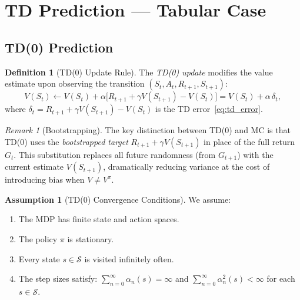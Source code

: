 \documentclass[11pt,a4paper]{article}
\theoremstyle{definition}
\newtheorem{definition}{Definition}[section]
\newtheorem{assumption}{Assumption}[section]
\theoremstyle{plain}
\theoremstyle{remark}
\newtheorem{remark}{Remark}[section]
\begin{document}
\section{TD Prediction --- Tabular Case}
\label{sec:td_prediction}

\subsection{TD(0) Prediction}
\label{subsec:td0}

\begin{definition}[TD(0) Update Rule]
\label{def:td0}
The \emph{TD(0) update} modifies the value estimate upon observing the transition $(S_t, A_t, R_{t+1}, S_{t+1})$:
\begin{equation}
    V(S_t) \leftarrow V(S_t) + \alpha \bigl[R_{t+1} + \gamma V(S_{t+1}) - V(S_t)\bigr] = V(S_t) + \alpha\,\delta_t,
    \label{eq:td0_update}
\end{equation}
where $\delta_t = R_{t+1} + \gamma V(S_{t+1}) - V(S_t)$ is the TD error~\eqref{eq:td_error}.
\end{definition}

\begin{remark}[Bootstrapping]
\label{rem:bootstrapping}
The key distinction between TD(0) and MC is that TD(0) uses the \emph{bootstrapped target} $R_{t+1} + \gamma V(S_{t+1})$ in place of the full return $G_t$. This substitution replaces all future randomness (from $G_{t+1}$) with the current estimate $V(S_{t+1})$, dramatically reducing variance at the cost of introducing bias when $V \neq V^\pi$.
\end{remark}

\begin{assumption}[TD(0) Convergence Conditions]
\label{ass:td0_convergence}
We assume:
\begin{enumerate}[nosep]
    \item The MDP has finite state and action spaces.
    \item The policy $\pi$ is stationary.
    \item Every state $s \in \mathcal{S}$ is visited infinitely often.
    \item The step sizes satisfy: $\sum_{n=0}^{\infty} \alpha_n(s) = \infty$ and $\sum_{n=0}^{\infty} \alpha_n^2(s) < \infty$ for each $s \in \mathcal{S}$.
\end{enumerate}
\end{assumption}
\end{document}
